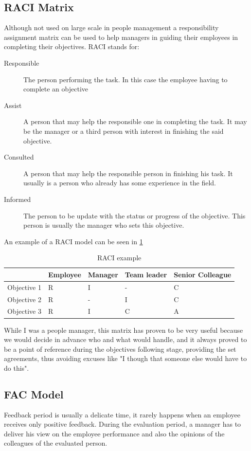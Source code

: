 \subsection{RACI Matrix}
\label{subsec:raci}
Although not used on large scale in people management a responsibility assignment matrix can be used to help managers in guiding their employees in completing their objectives.
RACI stands for:
\begin{description}
\item[Responsible] The person performing the task. In this case the employee having to complete an objective
\item[Assist] A person that may help the responsible one in completing the task. It may be the manager or a third person with interest in finishing the said objective.
\item[Consulted] A person that may help the responsible person in finishing his task. It usually is a person who already has some experience in the field.
\item[Informed] The person to be update with the status or progress of the objective. This person is usually the manager who sets this objective.
\end{description}
An example of a RACI model can be seen in \cref{table:raciex}
\begin{table}[h]
  \centering
  \caption{RACI example}
    \begin{tabular}{ llllp{3cm}}
    \toprule
    & Employee & Manager & Team leader & Senior Colleague \\ \midrule
    Objective 1 & R & I & - & C \\ \midrule
    Objective 2 & R & - & I & C \\ \midrule
    Objective 3 & R & I & C & A \\ \bottomrule
    \end{tabular}
    \label{table:raciex}
\end{table}

While I was a people manager, this matrix has proven to be very useful because we would decide in advance who and what would handle, and it always proved to be a point of reference during the objectives following stage, providing the set agreements, thus avoiding excuses like "I though that someone else would have to do this".
\subsection{FAC Model}
\label{subsec:fac}
Feedback period is usually a delicate time, it rarely happens when an employee receives only positive feedback. During the evaluation period, a manager has to deliver his view on the employee performance and also the opinions of the colleagues of the evaluated person. 

